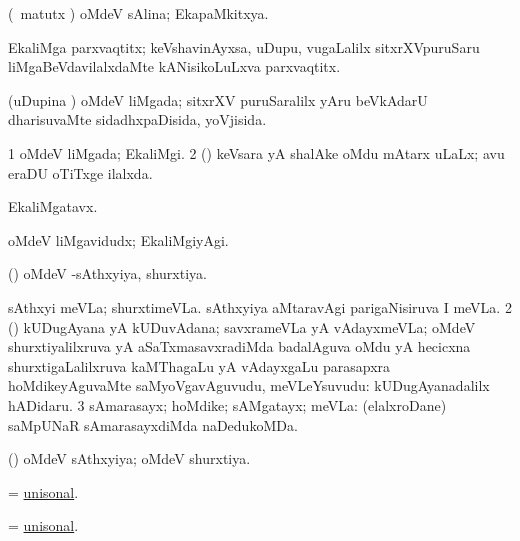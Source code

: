 \bentry
{} 
\gl{\gu}
\expl{}
\bmng
(\savi\ matutx \pArxvi) oMdeV sAlina; EkapaMkitxya. 
\emng
\eentry

\bentry
{} 
\gl{\nA}
\expl{}
\bmng
EkaliMga parxvaqtitx; keVshavinAyxsa, uDupu, \mo vugaLalilx sitxrXVpuruSaru liMgaBeVdavilalxdaMte kANisikoLuLxva parxvaqtitx. 
\emng
\eentry

\bentry
{} 
\gl{\gu}
\expl{}
\bmng
(uDupina \vi) oMdeV liMgada; sitxrXV puruSaralilx yAru beVkAdarU dharisuvaMte sidadhxpaDisida, yoVjisida. 
\emng
\eentry

\bentry
{} 
\gl{\gu}
\expl{}
\bmng
\bnum
\num{1} oMdeV liMgada; EkaliMgi. 
\num{2} (\savi) keVsara yA shalAke oMdu mAtarx uLaLx; avu eraDU oTiTxge ilalxda. 
\enum
\emng
\eentry

\bentry
{} 
\gl{\nA}
\expl{}
\bmng
EkaliMgatavx. 
\emng
\eentry

\bentry
{} 
\gl{\kirxvi}
\expl{}
\bmng
oMdeV liMgavidudx; EkaliMgiyAgi. 
\emng
\eentry

\bentry
{} 
\gl{\gu}
\expl{}
\bmng
(\saM) oMdeV -sAthxyiya, shurxtiya. 
\emng
\eentry

\bentry
{} 
\gl{\nA}
\expl{}
\bmng
\bnum
{} 
\banum
{} sAthxyi meVLa; shurxtimeVLa. 
 sAthxyiya aMtaravAgi parigaNisiruva I meVLa. 
\eanum
\numie
\num{2} (\saM) kUDugAyana yA kUDuvAdana; savxrameVLa yA vAdayxmeVLa; oMdeV shurxtiyalilxruva yA aSaTxmasavxradiMda badalAguva oMdu yA hecicxna shurxtigaLalilxruva kaMThagaLu yA vAdayxgaLu parasapxra hoMdikeyAguvaMte saMyoVgavAguvudu, meVLeYsuvudu:  kUDugAyanadalilx hADidaru. 
\num{3} sAmarasayx; hoMdike; sAMgatayx; meVLa:  (elalxroDane) saMpUNaR sAmarasayxdiMda naDedukoMDa. 
\enum
\emng
\eentry

\bentry
{} 
\gl{\gu}
\expl{}
\bmng
(\saM) oMdeV sAthxyiya; oMdeV shurxtiya. 
\emng
\eentry

\bentry
{} 
\gl{\gu}
\expl{}
\bmng
= \hyperlink{unisonal}{unisonal}. 
\emng
\eentry

\bentry
{} 
\gl{\gu}
\expl{}
\bmng
= \hyperlink{unisonal}{unisonal}. 
\emng
\eentry

